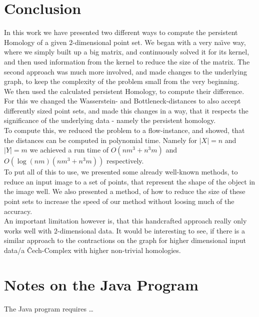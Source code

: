 \documentclass[11pt, a4paper, UKenglish]{article}
\begin{document}
    \section*{Conclusion}
    In this work we have presented two different ways to compute the persistent Homology of a given $2$-dimensional point set.
    We began with a very na\"{\i}ve way, where we simply built up a big matrix, and continuously solved it for its kernel, and then used information from the kernel to reduce the size of the matrix.
    The second approach was much more involved, and made changes to the underlying graph, to keep the complexity of the problem small from the very beginning.\\
    We then used the calculated persistent Homology, to compute their difference.
    For this we changed the Wasserstein- and Bottleneck-distances to also accept differently sized point sets, and made this changes in a way, that it respects the significance of the underlying data - namely the persistent homology.\\
    To compute this, we reduced the problem to a flow-instance, and showed, that the distances can be computed in polynomial time.
    Namely for $|X|=n$ and $|Y|=m$ we achieved a run time of $O(nm^3+n^3 m)$ and $O(\log(nm)(nm^3+n^3 m))$ respectively.\\
    To put all of this to use, we presented some already well-known methods, to reduce an input image to a set of points, that represent the shape of the object in the image well.
    We also presented a method, of how to reduce the size of these point sets to increase the speed of our method without loosing much of the accuracy.\\
    An important limitation however is, that this handcrafted approach really only works well with $2$-dimensional data.
    It would be interesting to see, if there is a similar approach to the contractions on the graph for higher dimensional input data/a Čech-Complex with higher non-trivial homologies.
    \newpage
    \section*{Notes on the Java Program}
    The Java program requires \ldots

    \newpage
    
\end{document}
